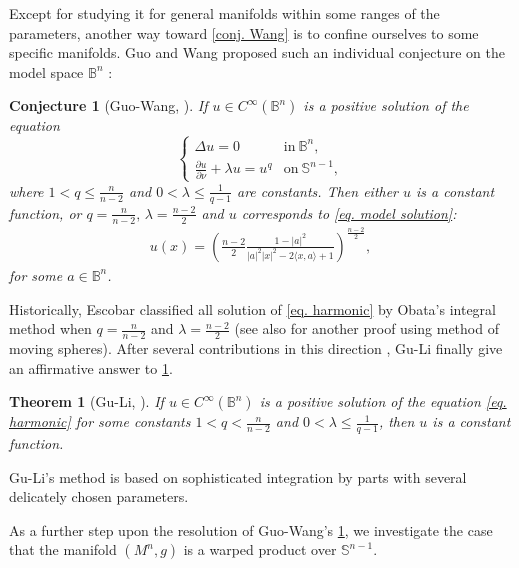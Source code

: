 \documentclass[12pt]{amsart}%
\newtheorem{theorem}{Theorem}
\newtheorem{conjecture}{Conjecture}
\numberwithin{equation}{section}
\numberwithin{lemma}{section}
\numberwithin{proposition}{section}
\numberwithin{corollary}{section}
\numberwithin{remark}{section}
\begin{document}
	Except for studying it for general manifolds within some ranges of the parameters,  another way toward \cref{conj. Wang} is to confine ourselves to some specific manifolds. Guo and Wang  proposed such an individual conjecture on the model space $\mathbb{B}^n$  \cite[Conjecture 1]{GW20}:
    \begin{conjecture}[Guo-Wang, \cite{GW20}]\label{conj.Guo-Wang}
        If $u\in C^{\infty}(\mathbb{B}^n)$ is a positive solution of the  equation
        \begin{equation}\label{eq. harmonic}
            \begin{cases}
                \Delta u=0 &\mathrm{ in} \ \mathbb{B}^n,\\
                \frac{\partial u}{\partial\nu}+\lambda u=u^q &\mathrm{on}\ \mathbb{S}^{n-1},
            \end{cases}
        \end{equation}
        where $1<q\leq\frac{n}{n-2}$ and $0<\lambda \leq \frac{1}{q-1}$ are constants. Then either $u$ is a constant function, or $q=\frac{n}{n-2},\, \lambda=\frac{n-2}{2}$ and $u$ corresponds to \cref{eq. model solution}:
    \begin{align*}
            u(x)=\left(
            \frac{n-2}{2}\frac{1-|a|^2}{|a|^2|x|^2-2\langle x,a\rangle+1}
            \right)^{\frac{n-2}{2}},
        \end{align*}
        for some $a\in \mathbb{B}^n$.
    \end{conjecture}

    Historically, Escobar \cite[Theorem 2.1]{Esc90}  classified all solution of \cref{eq. harmonic} by Obata's integral method \cite{Oba71} when $q=\frac{n}{n-2}$ and $\lambda=\frac{n-2}{2}$ (see also \cite{LZ95} for another proof using method of moving spheres). After several contributions  in this direction \cite{GW20,GHW21,LO23,Ou24}, Gu-Li \cite[Theorem 1.1]{GL25} finally give an affirmative answer to \cref{conj.Guo-Wang}.
    \begin{theorem}[Gu-Li, \cite{GL25}]\label{thm. GL25}
        If $u\in C^{\infty}(\mathbb{B}^n)$ is a positive solution of the  equation
        \cref{eq. harmonic}
        for some constants $1<q<\frac{n}{n-2}$ and $0<\lambda \leq \frac{1}{q-1}$, then $u$ is a constant function.
    \end{theorem}
    Gu-Li's method is based on sophisticated integration by parts with several delicately chosen parameters.

As a further step upon the resolution of Guo-Wang's \cref{conj.Guo-Wang}, we investigate the  case that the manifold $(M^n,g)$ is a warped product over $\mathbb{S}^{n-1}$.
\end{document}
